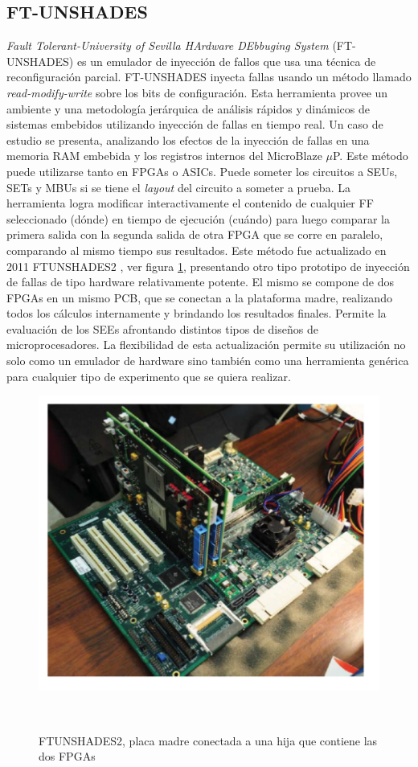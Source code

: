 \documentclass[a4paper,openright,12pt]{report}
\begin{document}
\subsection{FT-UNSHADES} 
\textit{Fault Tolerant-University of Sevilla HArdware DEbbuging System} \linebreak
(FT-UNSHADES) \cite{Guzman2008} es un emulador de inyección de fallos que usa una técnica de reconfiguración parcial. FT-UNSHADES inyecta fallas usando un método llamado \textit{read-modify-write} sobre los bits de configuración. Esta herramienta provee un ambiente y una metodología jerárquica de  análisis rápidos y dinámicos de sistemas embebidos utilizando inyección de fallas en tiempo real. Un caso de estudio se presenta, analizando los efectos de la inyección de fallas en una memoria RAM embebida y los registros internos del MicroBlaze $\mu$P. Este método puede utilizarse tanto en FPGAs o ASICs.
Puede someter los circuitos a SEUs, SETs y MBUs si se tiene el \textit{layout} del circuito a someter a prueba.
La herramienta logra modificar interactivamente el contenido de cualquier FF  seleccionado (dónde) en tiempo de ejecución (cuándo) para luego comparar la primera salida con la segunda salida de otra FPGA que se corre en paralelo, comparando al mismo  tiempo sus resultados.
Este método fue actualizado en 2011 FTUNSHADES2 \cite{6131392}, ver figura \ref{FT-UNSHADES}, presentando otro tipo prototipo de inyección de fallas de tipo hardware relativamente potente. El mismo se compone de dos FPGAs en un mismo PCB, que se conectan a la plataforma madre, realizando todos los cálculos internamente y brindando los resultados finales. Permite la evaluación de  los SEEs afrontando distintos tipos de diseños de microprocesadores. La flexibilidad de esta actualización permite su  utilización no solo como un emulador de hardware sino también como una herramienta genérica para cualquier tipo de experimento que se quiera realizar.


\begin{figure}[H]
	\centering
	\includegraphics[width=0.60 \textwidth]{img/FT.pdf}
	\caption{FTUNSHADES2, placa madre conectada a una hija que contiene las dos FPGAs}
     ~\cite{6131392}
	\label{FT-UNSHADES}
\end{figure}
\end{document}
